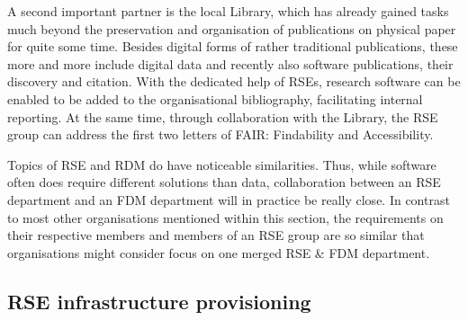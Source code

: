 \documentclass{article}
\begin{document}
A second important partner is the local Library, which has already gained tasks much beyond the preservation and organisation of publications on physical paper for quite some time.
Besides digital forms of rather traditional publications, these more and more include digital data and recently also software publications, their discovery and citation.
With the dedicated help of RSEs, research software can be enabled to be added to the organisational bibliography, facilitating internal reporting.
At the same time, through collaboration with the Library, the RSE group can address the first two letters of FAIR: Findability and Accessibility.

Topics of RSE and RDM do have noticeable similarities.
Thus, while software often does require different solutions than data, collaboration between an RSE department and an FDM department will in practice be really close.
In contrast to most other organisations mentioned within this section,
the requirements on their respective members and members of an RSE group are so similar that organisations might consider focus on one merged RSE \& FDM department.

\subsection{RSE infrastructure provisioning}
\end{document}
